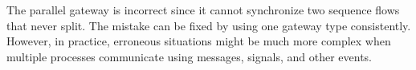 \documentclass[runningheads]{llncs}
\begin{document}
The parallel gateway is incorrect since it cannot synchronize two sequence flows that never split.
The mistake can be fixed by using one gateway type consistently.
However, in practice, erroneous situations might be much more complex when multiple processes communicate using messages, signals, and other events.
\end{document}
